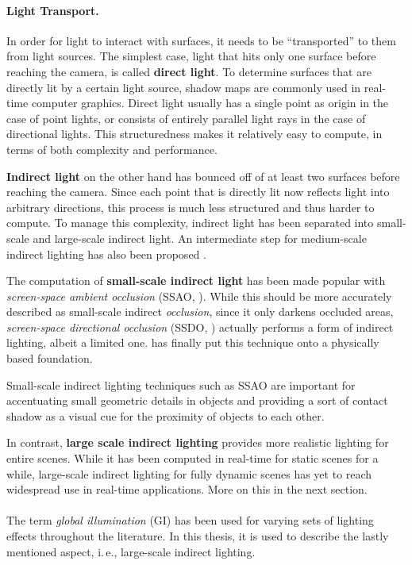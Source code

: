 \paragraph{Light Transport.}

In order for light to interact with surfaces, it needs to be ``transported'' to them from light sources. The simplest case, light that hits only one surface before reaching the camera, is called \textbf{direct light}. To determine surfaces that are directly lit by a certain light source, shadow maps are commonly used in real-time computer graphics. Direct light usually has a single point as origin in the case of point lights, or consists of entirely parallel light rays in the case of directional lights. This structuredness makes it relatively easy to compute, in terms of both complexity and performance.

\textbf{Indirect light} on the other hand has bounced off of at least two surfaces before reaching the camera. Since each point that is directly lit now reflects light into arbitrary directions, this process is much less structured and thus harder to compute. To manage this complexity, indirect light has been separated into small-scale and large-scale indirect light. An intermediate step for medium-scale indirect lighting has also been proposed \citep{reed:2012:mediumAO}.

The computation of \textbf{small-scale indirect light} has been made popular with \textit{screen-space ambient occlusion} (SSAO, \cite{Mittring:2007:Cryengine2}). While this should be more accurately described as small-scale indirect \textit{occlusion}, since it only darkens occluded areas, \textit{screen-space directional occlusion} (SSDO, \cite{Ritschel:2009:SSDO}) actually performs a form of indirect lighting, albeit a limited one. \citet{jimenez:2016:AO} has finally put this technique onto a physically based foundation.

Small-scale indirect lighting techniques such as SSAO are important for accentuating small geometric details in objects and providing a sort of contact shadow as a visual cue for the proximity of objects to each other.

In contrast, \textbf{large scale indirect lighting} provides more realistic lighting for entire scenes. While it has been computed in real-time for static scenes for a while, large-scale indirect lighting for fully dynamic scenes has yet to reach widespread use in real-time applications. More on this in the next section.
\\
\\
The term \textit{global illumination} (GI) has been used for varying sets of lighting effects throughout the literature. In this thesis, it is used to describe the lastly mentioned aspect, i.\,e., large-scale indirect lighting.



